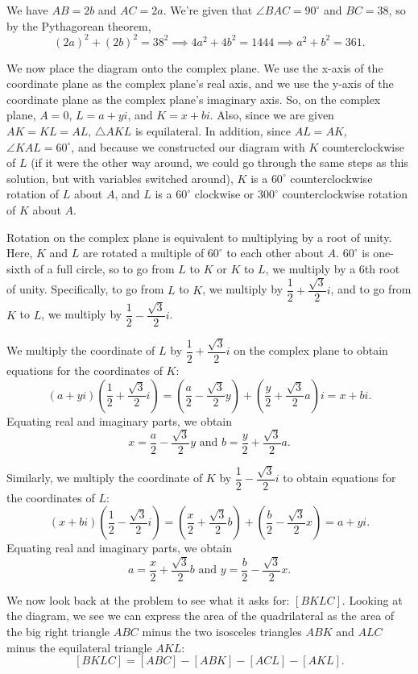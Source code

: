 \begin{enumerate}
 We have $AB = 2b$ and $AC = 2a$. We’re given that $\angle BAC = 90^\circ$ and $BC = 38$, so by the Pythagorean theorem, 
 \[(2a)^2 + (2b)^2 = 38^2 \implies 4a^2 + 4b^2 = 1444 \implies a^2 + b^2 = 361.\]

 We now place the diagram onto the complex plane. We use the x-axis of the coordinate plane as the complex plane’s real axis, and we use the y-axis of the coordinate plane as the complex plane’s imaginary axis. So, on the complex plane, $A = 0$, $L = a + yi$, and $K = x + bi$. Also, since we are given $AK = KL = AL$, $\triangle AKL$ is equilateral. In addition, since $AL = AK$, $\angle KAL = 60^\circ$, and because we constructed our diagram with $K$ counterclockwise of $L$ (if it were the other way around, we could go through the same steps as this solution, but with variables switched around), $K$ is a $60^\circ$ counterclockwise rotation of $L$ about $A$, and $L$ is a $60^\circ$ clockwise or $300^\circ$ counterclockwise rotation of $K$ about $A$.

 Rotation on the complex plane is equivalent to multiplying by a root of unity. Here, $K$ and $L$ are rotated a multiple of $60^\circ$ to each other about $A$. $60^\circ$ is one-sixth of a full circle, so to go from $L$ to $K$ or $K$ to $L$, we multiply by a 6th root of unity. Specifically, to go from $L$ to $K$, we multiply by $\dfrac{1}{2} + \dfrac{\sqrt{3}}{2}i$, and to go from $K$ to $L$, we multiply by $\dfrac{1}{2} - \dfrac{\sqrt{3}}{2}i$.

 We multiply the coordinate of $L$ by $\dfrac{1}{2} + \dfrac{\sqrt{3}}{2}i$ on the complex plane to obtain equations for the coordinates of $K$: 
 \[(a + yi)\left(\dfrac{1}{2} + \dfrac{\sqrt{3}}{2}i\right) = \left(\dfrac{a}{2} - \dfrac{\sqrt{3}}{2}y\right) + \left(\dfrac{y}{2} + \dfrac{\sqrt{3}}{2}a\right)i = x + bi.\] Equating real and imaginary parts, we obtain 
 \[x = \dfrac{a}{2} - \dfrac{\sqrt{3}}{2}y \text{ and } b = \dfrac{y}{2} + \dfrac{\sqrt{3}}{2}a.\]

 Similarly, we multiply the coordinate of $K$ by $\dfrac{1}{2} - \dfrac{\sqrt{3}}{2}i$ to obtain equations for the coordinates of $L$: 
 \[(x + bi)\left(\dfrac{1}{2} - \dfrac{\sqrt{3}}{2}i\right) = \left(\dfrac{x}{2} + \dfrac{\sqrt{3}}{2}b\right) + \left(\dfrac{b}{2} - \dfrac{\sqrt{3}}{2}x\right) = a + yi.\] Equating real and imaginary parts, we obtain 
 \[a = \dfrac{x}{2} + \dfrac{\sqrt{3}}{2}b \text{ and } y = \dfrac{b}{2} - \dfrac{\sqrt{3}}{2}x.\]

 We now look back at the problem to see what it asks for: $[BKLC]$. Looking at the diagram, we see we can express the area of the quadrilateral as the area of the big right triangle $ABC$ minus the two isosceles triangles $ABK$ and $ALC$ minus the equilateral triangle $AKL$: 
 \[[BKLC] = [ABC] - [ABK] - [ACL] - [AKL].\]


\end{enumerate}
